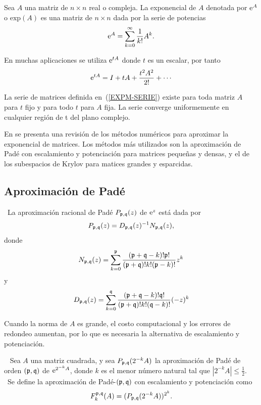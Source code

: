 \begin{definition}
    \label{EXPM}\cite{golub2013matrix} Sea $A$ una matriz de $n\times n$ real o compleja. La exponencial de $A$ denotada por
    $ \mathrm{e}^{A} $ o $\mathrm{exp}(A)$ es una matriz de $n\times n$ dada por la serie de potencias
    \[\mathrm{e}^{A}=\sum_{k=0}^{\infty}\frac{1}{k!}A^{k}.\]
\end{definition}
En muchas aplicaciones se utiliza $\mathrm{e}^{tA}$ donde $t$ es un escalar, por tanto 
\begin{equation}
\me{tA}=I+tA+\frac{t^{2}A^{2}}{2!}+\cdots\label{EXPM-SERIE}
\end{equation}
\begin{theorem}\cite{IntroMatrix}
    La serie de matrices definida en~(\ref{EXPM-SERIE}) existe para toda matriz $A$ para $t$ fijo y
    para todo $t$ para $A$ fija. La serie converge uniformemente en cualquier región de t del plano complejo.
\end{theorem}

En \cite{moler2003nineteen} se presenta una revisión de los métodos numéricos
para aproximar
la exponencial de matrices. Los métodos más utilizados son la aproximación de Padé con escalamiento
y potenciación para matrices pequeñas y densas, y el de los subespacios de Krylov para matices grandes y esparcidas.


\subsection{Aproximación de Padé}\label{section:pade-approx}
\begin{definition}
    \cite{golub2013matrix}~La aproximación racional de Padé $P_{\mathfrak{p},\mathfrak{q}}(z)$
    de $\mathrm{e}^{z}$ está dada por 
    \begin{equation*}
    P_{\mathfrak{p},\mathfrak{q}}(z)=D_{\mathfrak{p},\mathfrak{q}}(z)^{-1}N_{\mathfrak{p},\mathfrak{q}}(z),  \label{FORM PADE}
    \end{equation*}%
    donde 
    \[
    N_{\mathfrak{p},\mathfrak{q}}(z)=\sum\limits_{k=0}^{\mathfrak{p}}\frac{(\mathfrak{p}+\mathfrak{q}-k)!\mathfrak{p}!}{(\mathfrak{p}+\mathfrak{q})!k!(\mathfrak{p}-k)!}z^k
    \]%
    y 
    \[
    D_{\mathfrak{p},\mathfrak{q}}(z)=\sum\limits_{k=0}^{\mathfrak{q}}\frac{(\mathfrak{p}+\mathfrak{q}-k)!\mathfrak{q}!}{(\mathfrak{p}+\mathfrak{q})!k!(\mathfrak{q}-k)!}(-z)^k
    \]
\end{definition}

Cuando la norma de   $A$ es grande, el costo computacional y los errores de redondeo  aumentan, por lo que
es necesaria la alternativa de escalamiento y potenciación.

\begin{definition}\cite{golub2013matrix}~
    Sea $A$ una matriz cuadrada, y sea $P_{\pf,\qf}(2^{-k}A%
    )$ la aproximación de Padé de orden $(\mathfrak{p},\mathfrak{q})\ $de $\me{2^{-k}A%
    }$, donde $k$ es el menor número natural tal que $\left\vert 2^{-k}A%
    \right\vert \leq \frac{1}{2}$. \ Se define la aproximación de  Padé-$(\mathfrak{p},\mathfrak{q})$ con escalamiento y potenciación como 
    \begin{equation}
    F_{k}^{\mathfrak{p},\mathfrak{q}}(A)=(P_{\mathfrak{p},\mathfrak{q}}(2^{-k}A))^{2^{k}}.
    \label{P-MA-2}
    \end{equation}
\end{definition}

